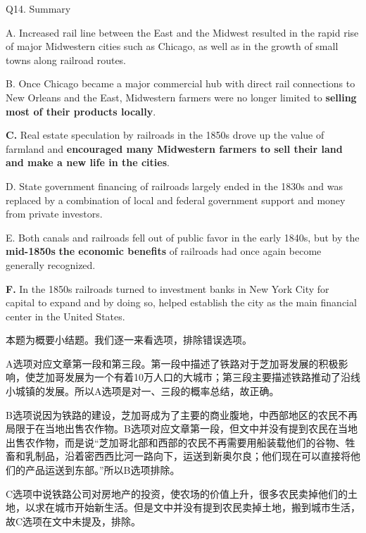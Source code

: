 \begin{blk}
    \begin{qst}
        Q14. Summary
    \end{qst}

    \begin{chc}
        A. Increased rail line between the East and the Midwest resulted in the rapid rise of major Midwestern cities such as Chicago, as well as in the growth of small towns along railroad routes.

        B. Once Chicago became a major commercial hub with direct rail connections to New Orleans and the East, Midwestern farmers were no longer limited to \textbf{selling most of their products locally}.

        \textbf{C.} Real estate speculation by railroads in the 1850s drove up the value of farmland and \textbf{encouraged many Midwestern farmers to sell their land and make a new life in the cities}.

        D. State government financing of railroads largely ended in the 1830s and was replaced by a combination of local and federal government support and money from private investors.

        E. Both canals and railroads fell out of public favor in the early 1840s, but by the \textbf{mid-1850s} \textbf{the economic benefits} of railroads had once again become generally recognized.

        \textbf{F.} In the 1850s railroads turned to investment banks in New York City for capital to expand and by doing so, helped establish the city as the main financial center in the United States.
    \end{chc}

    \begin{nlz}
        本题为概要小结题。我们逐一来看选项，排除错误选项。

        A选项对应文章第一段和第三段。第一段中描述了铁路对于芝加哥发展的积极影响，使芝加哥发展为一个有着10万人口的大城市；第三段主要描述铁路推动了沿线小城镇的发展。所以A选项是对一、三段的概率总结，故正确。

        B选项说因为铁路的建设，芝加哥成为了主要的商业腹地，中西部地区的农民不再局限于在当地出售农作物。B选项对应文章第一段，但文中并没有提到农民在当地出售农作物，而是说“芝加哥北部和西部的农民不再需要用船装载他们的谷物、牲畜和乳制品，沿着密西西比河一路向下，运送到新奥尔良；他们现在可以直接将他们的产品运送到东部。”所以B选项排除。

        C选项中说铁路公司对房地产的投资，使农场的价值上升，很多农民卖掉他们的土地，以求在城市开始新生活。但是文中并没有提到农民卖掉土地，搬到城市生活，故C选项在文中未提及，排除。


\end{nlz}
\end{blk}

